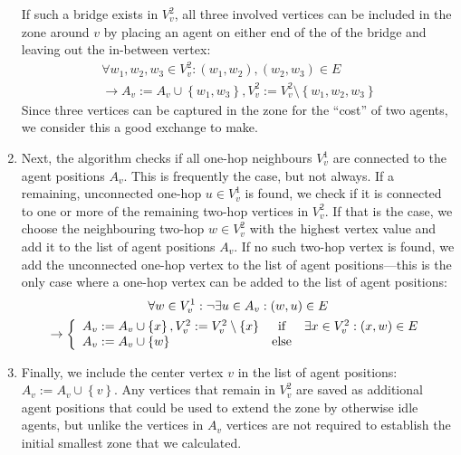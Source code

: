 \begin{enumerate}
        If such a bridge exists in $V_v^2$, all three involved vertices can be included in the zone around $v$ by placing an agent on either end of the of the bridge and leaving out the in-between vertex:
        \begin{multline}
        \forall w_1, w_2, w_3 \in V_v^2: \left(w_1, w_2\right ), \left(w_2, w_3 \right ) \in E \\ \rightarrow A_v := A_v \cup \left\{w_1, w_3 \right \}, V_v^2 := V_v^2 \setminus \left\{w_1,w_2,w_3\right\}
        \end{multline}
        Since three vertices can be captured in the zone for the \enquote{cost} of two agents, we consider this a good exchange to make.
  \item Next, the algorithm checks if all one-hop neighbours $V_v^1$ are connected to the agent positions $A_v$.
        This is frequently the case, but not always.
        If a remaining, unconnected one-hop $u \in V_v^1$ is found, we check if it is connected to one or more of the remaining two-hop vertices in $V_v^2$.
        If that is the case, we choose the neighbouring two-hop $w \in V_v^2$ with the highest vertex value and add it to the list of agent positions $A_v$.
        If no such two-hop vertex is found, we add the unconnected one-hop vertex to the list of agent positions---this is the only case where a one-hop vertex can be added to the list of agent positions: \begin{multline}
        \forall w \in V_v^1: \lnot \exists u \in A_v: \left(w, u \right ) \in E \\\rightarrow \left\{\begin{array}{lcl}
A_v := A_v \cup \left\{x\right\}, V_v^2 := V_v^2 \setminus \left\{x\right\} & \textup{if} & \exists x \in V_v^2: \left(x, w \right ) \in E\\
A_v := A_v \cup \left\{w\right\} &\textup{else} &
\end{array}\right.
        \end{multline}
  \item Finally, we include the center vertex $v$ in the list of agent positions: $A_v := A_v \cup \left\{v\right\}$.
        Any vertices that remain in $V_v^2$ are saved as additional agent positions that could be used to extend the zone by otherwise idle agents, but unlike the vertices in $A_v$ vertices are not required to establish the initial smallest zone that we calculated.
\end{enumerate}
